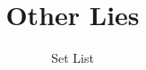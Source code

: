 \usepackage{array}
\usepackage[table]{xcolor}

\usepackage[chorded,noscripture]{songs}
\usepackage{lyluatex}

\usepackage{fontspec}
\usepackage{lilyglyphs}

\usepackage{graphicx}

\indexeson
{}

\renewcommand{\everychorus}{\textnote{Chorus:}}

\renewcommand{\lyricfont}{\sffamily\small}
\renewcommand{\printchord}[1]{\rmfamily\bf#1}


\title{Other Lies}
\author{Set List}
